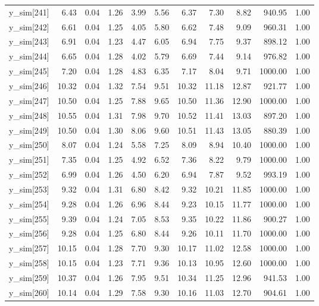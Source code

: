 \begin{table}[ht]
\begin{tabular}{rrrrrrrrrrr}
  y\_sim[241] & 6.43 & 0.04 & 1.26 & 3.99 & 5.56 & 6.37 & 7.30 & 8.82 & 940.95 & 1.00 \\ 
  y\_sim[242] & 6.61 & 0.04 & 1.25 & 4.05 & 5.80 & 6.62 & 7.48 & 9.09 & 960.31 & 1.00 \\ 
  y\_sim[243] & 6.91 & 0.04 & 1.23 & 4.47 & 6.05 & 6.94 & 7.75 & 9.37 & 898.12 & 1.00 \\ 
  y\_sim[244] & 6.65 & 0.04 & 1.28 & 4.02 & 5.79 & 6.69 & 7.44 & 9.14 & 976.82 & 1.00 \\ 
  y\_sim[245] & 7.20 & 0.04 & 1.28 & 4.83 & 6.35 & 7.17 & 8.04 & 9.71 & 1000.00 & 1.00 \\ 
  y\_sim[246] & 10.32 & 0.04 & 1.32 & 7.54 & 9.51 & 10.32 & 11.18 & 12.87 & 921.77 & 1.00 \\ 
  y\_sim[247] & 10.50 & 0.04 & 1.25 & 7.88 & 9.65 & 10.50 & 11.36 & 12.90 & 1000.00 & 1.00 \\ 
  y\_sim[248] & 10.55 & 0.04 & 1.31 & 7.98 & 9.70 & 10.52 & 11.41 & 13.03 & 897.20 & 1.00 \\ 
  y\_sim[249] & 10.50 & 0.04 & 1.30 & 8.06 & 9.60 & 10.51 & 11.43 & 13.05 & 880.39 & 1.00 \\ 
  y\_sim[250] & 8.07 & 0.04 & 1.24 & 5.58 & 7.25 & 8.09 & 8.94 & 10.40 & 1000.00 & 1.00 \\ 
  y\_sim[251] & 7.35 & 0.04 & 1.25 & 4.92 & 6.52 & 7.36 & 8.22 & 9.79 & 1000.00 & 1.00 \\ 
  y\_sim[252] & 6.99 & 0.04 & 1.26 & 4.50 & 6.20 & 6.94 & 7.87 & 9.52 & 993.19 & 1.00 \\ 
  y\_sim[253] & 9.32 & 0.04 & 1.31 & 6.80 & 8.42 & 9.32 & 10.21 & 11.85 & 1000.00 & 1.00 \\ 
  y\_sim[254] & 9.28 & 0.04 & 1.26 & 6.96 & 8.44 & 9.23 & 10.15 & 11.77 & 1000.00 & 1.00 \\ 
  y\_sim[255] & 9.39 & 0.04 & 1.24 & 7.05 & 8.53 & 9.35 & 10.22 & 11.86 & 900.27 & 1.00 \\ 
  y\_sim[256] & 9.28 & 0.04 & 1.25 & 6.80 & 8.44 & 9.26 & 10.11 & 11.70 & 1000.00 & 1.00 \\ 
  y\_sim[257] & 10.15 & 0.04 & 1.28 & 7.70 & 9.30 & 10.17 & 11.02 & 12.58 & 1000.00 & 1.00 \\ 
  y\_sim[258] & 10.15 & 0.04 & 1.23 & 7.71 & 9.36 & 10.13 & 10.95 & 12.60 & 1000.00 & 1.00 \\ 
  y\_sim[259] & 10.37 & 0.04 & 1.26 & 7.95 & 9.51 & 10.34 & 11.25 & 12.96 & 941.53 & 1.00 \\ 
  y\_sim[260] & 10.14 & 0.04 & 1.29 & 7.58 & 9.30 & 10.16 & 11.03 & 12.70 & 904.61 & 1.00 \\ 

\end{tabular}
\end{table}
